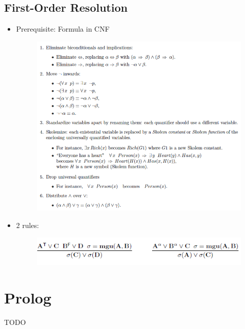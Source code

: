\documentclass{scrartcl}
\begin{document}
\subsection{First-Order Resolution}
\begin{itemize}
    \item
        Prerequisite: Formula in CNF
    
    \begin{figure}[H]
        \centering
        \includegraphics[scale=0.8]{figures/cnf}
    \end{figure} 

    \item
        2 rules:
 
    \begin{figure}[H]
        \centering
        \includegraphics[scale=0.8]{figures/444}
    \end{figure} 

\end{itemize}
\section{Prolog}
TODO
\end{document}
